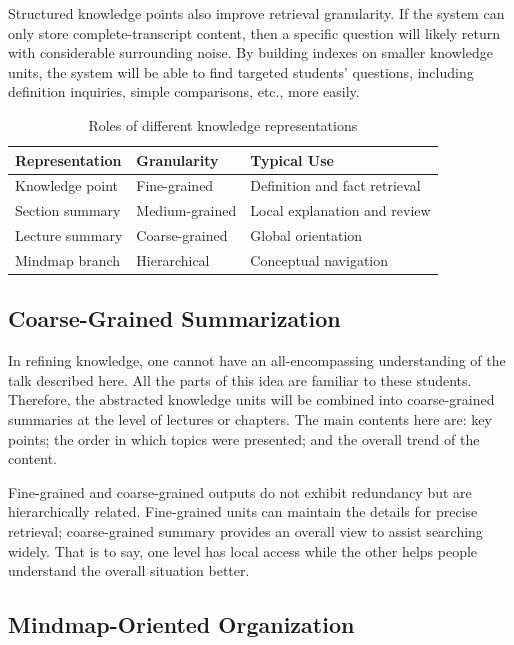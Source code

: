 Structured knowledge points also improve retrieval granularity. If the system can only store complete-transcript content, then a specific question will likely return with considerable surrounding noise. By building indexes on smaller knowledge units, the system will be able to find targeted students' questions, including definition inquiries, simple comparisons, etc., more easily.

\begin{table}[H]
    \centering
    \caption{Roles of different knowledge representations}
    \begin{tabular}{@{}lll@{}}
        \toprule
        \textbf{Representation} & \textbf{Granularity} & \textbf{Typical Use} \\ \midrule
        Knowledge point & Fine-grained & Definition and fact retrieval \\
        Section summary & Medium-grained & Local explanation and review \\
        Lecture summary & Coarse-grained & Global orientation \\
        Mindmap branch & Hierarchical & Conceptual navigation \\ \bottomrule
    \end{tabular}
\end{table}

\subsection{Coarse-Grained Summarization}

In refining knowledge, one cannot have an all-encompassing understanding of the talk described here. All the parts of this idea are familiar to these students. Therefore, the abstracted knowledge units will be combined into coarse-grained summaries at the level of lectures or chapters. The main contents here are: key points; the order in which topics were presented; and the overall trend of the content.

Fine-grained and coarse-grained outputs do not exhibit redundancy but are hierarchically related. Fine-grained units can maintain the details for precise retrieval; coarse-grained summary provides an overall view to assist searching widely. That is to say, one level has local access while the other helps people understand the overall situation better.

\subsection{Mindmap-Oriented Organization}

